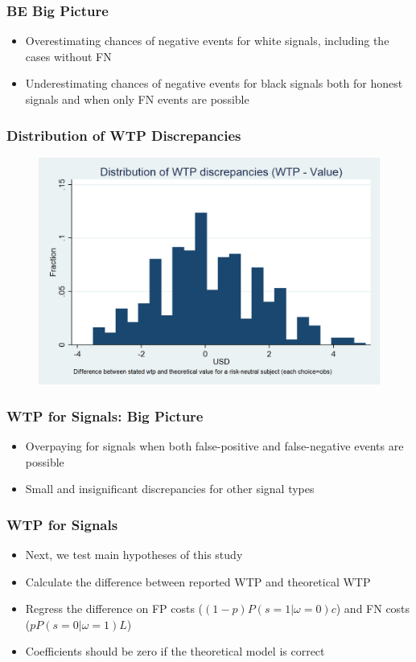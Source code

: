 \documentclass[11pt,hyperref={bookmarks=false}]{beamer}
\begin{document}
\begin{frame}
\frametitle{BE Big Picture}
\begin{itemize}
\item Overestimating chances of negative events for white signals, including the cases without FN
\item Underestimating chances of negative events for black signals both for honest signals and when only FN events are possible
\end{itemize}
\scriptsize

\end{frame}



\begin{frame}
\frametitle{Distribution of WTP Discrepancies}
\begin{figure}[h]
\includegraphics[scale=0.2]{Graphs/hist_WTP_discr1.png}
\end{figure}
\end{frame}





\begin{frame}
\frametitle{WTP for Signals: Big Picture}
\begin{itemize}
\item Overpaying for signals when both false-positive and false-negative events are possible
\item Small and insignificant discrepancies for other signal types
\end{itemize}
\small

\end{frame}


\begin{frame}
\frametitle{WTP for Signals}
\begin{itemize}
\item Next, we test main hypotheses of this study
\item Calculate the difference between reported WTP and theoretical WTP
\item Regress the difference on FP costs ($(1-p)P(s=1|\omega=0)c$) and FN costs ($pP(s=0|\omega=1)L$)
\item Coefficients should be zero if the theoretical model is correct
\end{itemize}
\end{frame}
\end{document}
